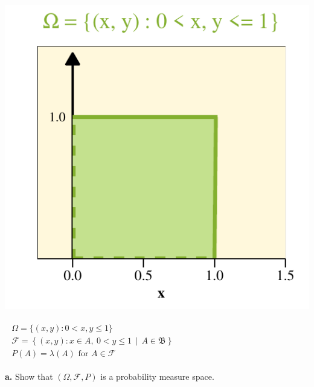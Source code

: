 \hfill
\begin{minipage}{0.39\textwidth}
  \includegraphics[width=\linewidth]{unit-square.pdf}
  \vspace{-1ex}
\end{minipage}
\hspace*{-1.5em}

\vspace{-0.39\textwidth}

\[
\begin{split}
\begin{gathered}
    \Omega= \{(x, y) : 0 < x, y \leq 1\}\\
    \mathcal{F} = \left\{(x, y) : x \in A,\ 0 < y \leq 1 \,\middle|\, A \in \mathfrak{B} \right\}\\
    P(A)= \lambda(A) \text{ for } A \in \mathcal{F} 
\end{gathered}
\end{split}
\begin{split}
\phantom{aaaaaaaaaaaaaaaaaaaaaaaaaaaaaa}
\end{split}
\]

\textbf{a.} Show that \((\Omega, \mathcal{F}, P)\) is a probability
measure space.

